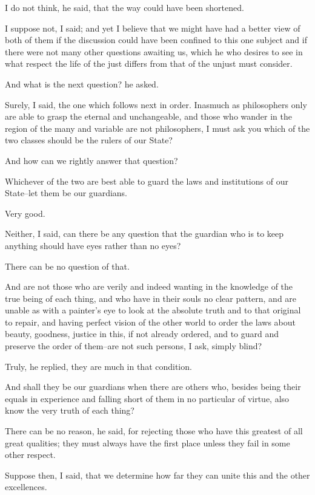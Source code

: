 I do not think, he said, that the way could have been shortened.

I suppose not, I said; and yet I believe that we might have had a better
view of both of them if the discussion could have been confined to this
one subject and if there were not many other questions awaiting us,
which he who desires to see in what respect the life of the just differs
from that of the unjust must consider.

And what is the next question? he asked.

Surely, I said, the one which follows next in order. Inasmuch as
philosophers only are able to grasp the eternal and unchangeable,
and those who wander in the region of the many and variable are not
philosophers, I must ask you which of the two classes should be the
rulers of our State?

And how can we rightly answer that question?

Whichever of the two are best able to guard the laws and institutions of
our State--let them be our guardians.

Very good.

Neither, I said, can there be any question that the guardian who is to
keep anything should have eyes rather than no eyes?

There can be no question of that.

And are not those who are verily and indeed wanting in the knowledge
of the true being of each thing, and who have in their souls no clear
pattern, and are unable as with a painter's eye to look at the absolute
truth and to that original to repair, and having perfect vision of the
other world to order the laws about beauty, goodness, justice in this,
if not already ordered, and to guard and preserve the order of them--are
not such persons, I ask, simply blind?

Truly, he replied, they are much in that condition.

And shall they be our guardians when there are others who, besides being
their equals in experience and falling short of them in no particular of
virtue, also know the very truth of each thing?

There can be no reason, he said, for rejecting those who have this
greatest of all great qualities; they must always have the first place
unless they fail in some other respect.

Suppose then, I said, that we determine how far they can unite this and
the other excellences.

